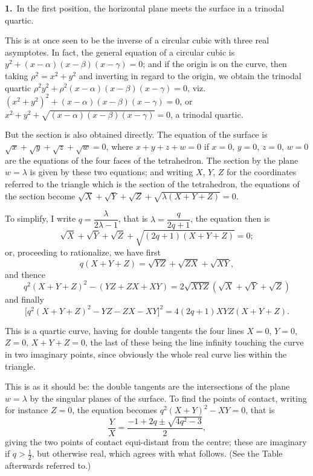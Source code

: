 \documentclass[11pt,a4paper]{book}
\begin{document}
\textbf{1.}\ In the first position, the horizontal plane meets the surface in a trinodal quartic.

This is at once seen to be the inverse of a circular cubic with three real asymptotes. In fact, the general equation of a circular cubic is $y^2 + (x - \alpha)(x - \beta)(x - \gamma) = 0$; and if the origin is on the curve, then taking $\rho^2 = x^2 + y^2$ and inverting in regard to the origin, we obtain the trinodal quartic $\rho^2 y^2 + \rho^2(x - \alpha)(x - \beta)(x - \gamma) = 0$, viz.\ $(x^2 + y^2)^2 + (x - \alpha)(x - \beta)(x - \gamma) = 0$, or $x^2 + y^2 + \sqrt{(x - \alpha)(x - \beta)(x - \gamma)} = 0$, a trinodal quartic.

But the section is also obtained directly. The equation of the surface is $\sqrt{x} + \sqrt{y} + \sqrt{z} + \sqrt{w} = 0$, where $x + y + z + w = 0$ if $x = 0$, $y = 0$, $z = 0$, $w = 0$ are the equations of the four faces of the tetrahedron. The section by the plane $w = \lambda$ is given by these two equations; and writing $X$, $Y$, $Z$ for the coordinates referred to the triangle which is the section of the tetrahedron, the equations of the section become $\sqrt{X} + \sqrt{Y} + \sqrt{Z} + \sqrt{\lambda(X + Y + Z)} = 0$.

To simplify, I write $q = \dfrac{\lambda}{2\lambda - 1}$, that is $\lambda = \dfrac{q}{2q + 1}$, the equation then is
\[
\sqrt{X} + \sqrt{Y} + \sqrt{Z} + \sqrt{(2q+1)(X + Y + Z)} = 0;
\]
or, proceeding to rationalize, we have first
\[
q(X + Y + Z) = \sqrt{YZ} + \sqrt{ZX} + \sqrt{XY},
\]
and thence
\[
q^2(X + Y + Z)^2 - (YZ + ZX + XY) = 2\sqrt{XYZ}(\sqrt{X} + \sqrt{Y} + \sqrt{Z})
\]
and finally
\[
\bigl[q^2(X + Y + Z)^2 - YZ - ZX - XY\bigr]^2 = 4(2q + 1)XYZ(X + Y + Z).
\]

This is a quartic curve, having for double tangents the four lines $X = 0$, $Y = 0$, $Z = 0$, $X + Y + Z = 0$, the last of these being the line infinity touching the curve in two imaginary points, since obviously the whole real curve lies within the triangle.

This is as it should be: the double tangents are the intersections of the plane $w = \lambda$ by the singular planes of the surface. To find the points of contact, writing for instance $Z = 0$, the equation becomes $q^2(X + Y)^2 - XY = 0$, that is
\[
\frac{Y}{X} = \frac{-1 + 2q \pm \sqrt{4q^2 - 3}}{2},
\]
giving the two points of contact equi-distant from the centre; these are imaginary if $q > \tfrac{1}{2}$, but otherwise real, which agrees with what follows. (See the Table afterwards referred to.)
\end{document}
